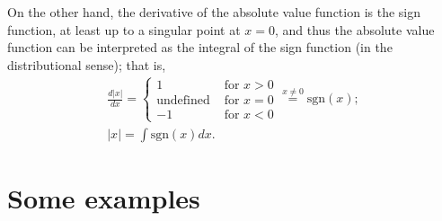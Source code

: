 On the other hand, the derivative of the absolute value function is the sign function, at least up to a singular point at $x=0$,
and thus the absolute value function can be interpreted as the integral of the sign function (in the distributional sense);
that is,
\begin{equation}
\begin{split}
\frac{d \left|x\right|}{dx} =
\left\{
\begin{array}{rl}
1&\textrm{ for } x > 0\\
\textrm{undefined}&\textrm{ for } x = 0\\
-1&\textrm{ for } x < 0
\end{array}
\right.
\stackrel{x\neq 0}{=}
\textrm{sgn} (x)
;\\
\left|x\right| =  \int \textrm{sgn} (x) dx.
\end{split}
 \end{equation}






\section{Some examples}

